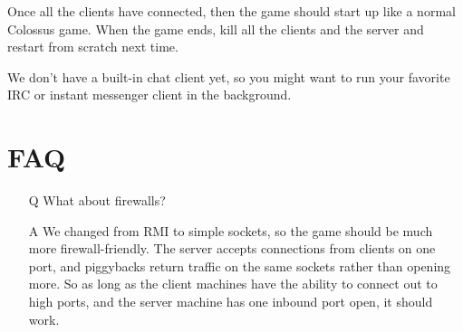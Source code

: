 \documentclass{article}
\begin{document}
Once all the clients have connected, then the game should start up like
a normal Colossus game.  When the game ends, kill all the clients and
the server and restart from scratch next time.

We don't have a built-in chat client yet, so you might want to run
your favorite IRC or instant messenger client in the background. 


\section{FAQ}

\begin{itemize}

\item[Q] What about firewalls?

\item[A] We changed from RMI to simple sockets, so the game should be
much more firewall-friendly.  The server accepts connections from 
clients on one port, and piggybacks return traffic on the same sockets
rather than opening more.  So as long as the client machines have the
ability to connect out to high ports, and the server machine has one
inbound port open, it should work.

\end{itemize}
\end{document}
